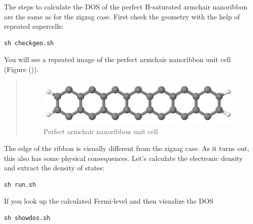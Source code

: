 \documentclass[a4paper,11pt,english]{sphinxmanual}
\begin{document}
{{The steps to calculate the DOS of the perfect H-saturated armchair
nanoribbon are the same as for the zigzag case. First check the
geometry with the help of repeated supercells:

\begin{Verbatim}[commandchars=\\\{\}]
sh checkgeo.sh
\end{Verbatim}

You will see a repeated image of the perfect armchair nanoribbon unit
cell (Figure {\hyperref[electstruct:fig-armchair-perfect-geo]{\emph{}}} ()).
\begin{quote}
\begin{figure}[htbp]
\centering
\capstart

\includegraphics[width=0.700\linewidth]{armchair-perfect-geo.png}
\caption{Perfect armchair nanoribbon unit cell}\label{electstruct:fig-armchair-perfect-geo}\end{figure}
\end{quote}

The edge of the ribbon is visually different from the zigzag case. As
it turns out, this also has some physical consequences. Let's
calculate the electronic density and extract the density of states:

\begin{Verbatim}[commandchars=\\\{\}]
sh run.sh
\end{Verbatim}

If you look up the calculated Fermi-level and then visualize the DOS

\begin{Verbatim}[commandchars=\\\{\}]
sh showdos.sh
\end{Verbatim}

}}
\end{document}
